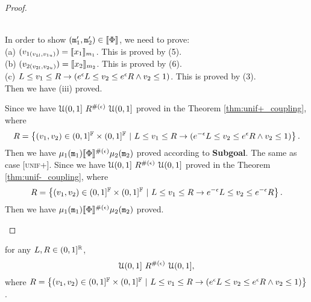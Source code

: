\documentclass[a4paper,11pt]{article}
\begin{document}
\begin{proof}
\begin{itemize}
\begin{subproof}
	\\
	In order to show $(\mathtt{m}_1', \mathtt{m}_2') \in \llbracket \Phi \rrbracket$, we need to prove:
	\\
	(a)	$(v_{1(v_{1l}, v_{1u})}) = \llbracket x_1 \rrbracket_{m_1}$.
	This is proved by (5).
	\\
	(b) $(v_{2(v_{2l}, v_{2u})}) = \llbracket x_2 \rrbracket_{m_2}$.
	This is proved by (6).
	\\
	(c) $L \leq v_1 \leq R \rightarrow
	(e^{\epsilon} L \leq v_2 \leq 	e^{\epsilon} R
	\land v_2 \leq 1)$.
	This is proved by (3).
	\\
	Then we have (iii) proved. 
	\end{subproof}
	Since we have $\mathcal{U}(0,1] ~ R^{\#(\epsilon)} ~ \mathcal{U}(0,1]$ proved in the Theorem \ref{thm:unif+_coupling},
	where 
	\[
		R = 
		\left \{(v_1, v_2) \in (0,1]^{\mathbb{F}} \times (0,1]^{\mathbb{F}} 
		~|~
		L \leq v_1 \leq R
		\rightarrow
		(e^{-\epsilon} L \leq v_2 \leq 	e^{\epsilon} R
		\land v_2 \leq 1)
		\right \}.
	\]	%
	Then we have $\mu_1(\mathtt{m}_1) \llbracket \Phi \rrbracket^{\#(\epsilon)} \mu_2(\mathtt{m}_2)$ proved according to \textbf{Subgoal}.
	The same as case [\textsc{unif+}].
		Since we have $\mathcal{U}(0,1] ~ R^{\#(\epsilon)} ~ \mathcal{U}(0,1]$ proved in the Theorem \ref{thm:unif-_coupling},
	where 
	\[
		R = 
		\left \{(v_1, v_2) \in (0,1]^{\mathbb{F}} \times (0,1]^{\mathbb{F}} 
		~|~
		L \leq v_1 \leq R
		\rightarrow
		e^{-\epsilon} L \leq v_2 \leq 	e^{-\epsilon} R
		\right \}.
	\]
	Then we have $\mu_1(\mathtt{m}_1) \llbracket \Phi \rrbracket^{\#(\epsilon)} \mu_2(\mathtt{m}_2)$ proved.
	\end{itemize}
\end{proof}
%
%
\newpage
\begin{thm}
\label{thm:unif+_coupling}
for any $L, R \in (0,1]^{\mathbb{R}}$, 
%
$${\mathcal{U}(0,1]} ~ R^{\#(\epsilon)} ~ {\mathcal{U}(0,1]},$$
%
where
	$	R = 
		\left \{(v_1, v_2) \in (0,1]^{\mathbb{F}} \times (0,1]^{\mathbb{F}} 
		~|~
		L \leq v_1 \leq R
		\rightarrow
		(e^{\epsilon} L \leq v_2 \leq 	e^{\epsilon} R
		\land v_2 \leq 1)
		\right \}
		$.
\end{thm}
%
\end{document}
